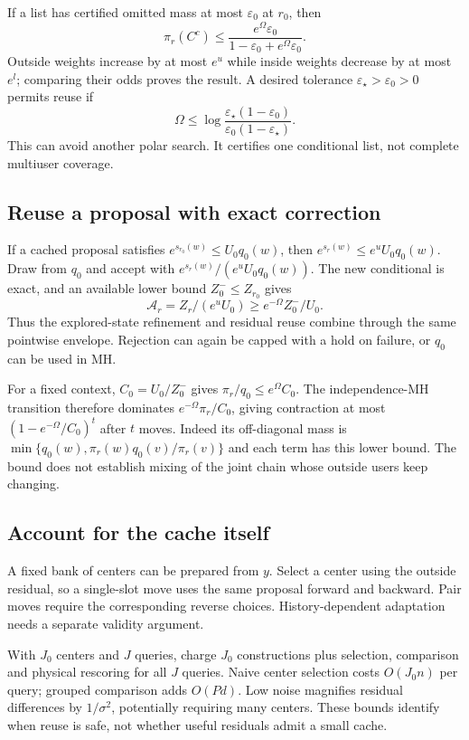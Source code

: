 \documentclass[10pt,a4paper]{article}
\begin{document}
If a list has certified omitted mass at most $\varepsilon_0$ at $r_0$, then
\begin{equation}
 \pi_r(C^c)\leq\frac{e^\Omega\varepsilon_0}{1-\varepsilon_0+e^\Omega\varepsilon_0}.
 \label{eq:reuse-odds}
\end{equation}
Outside weights increase by at most $e^u$ while inside weights decrease by at most $e^l$; comparing
their odds proves the result. A desired tolerance $\varepsilon_\star>\varepsilon_0>0$ permits reuse if
\[
 \Omega\leq\log\frac{\varepsilon_\star(1-\varepsilon_0)}{\varepsilon_0(1-\varepsilon_\star)}.
\]
This can avoid another polar search. It certifies one conditional list, not complete multiuser coverage.

\subsection{Reuse a proposal with exact correction}
If a cached proposal satisfies $e^{s_{r_0}(w)}\leq U_0q_0(w)$, then
$e^{s_r(w)}\leq e^uU_0q_0(w)$. Draw from $q_0$ and accept with
$e^{s_r(w)}/(e^uU_0q_0(w))$. The new conditional is exact, and an available lower bound
$Z_0^-\leq Z_{r_0}$ gives
\begin{equation}
 \mathcal A_r=Z_r/(e^uU_0)\geq e^{-\Omega}Z_0^-/U_0.
 \label{eq:reuse-acceptance}
\end{equation}
Thus the explored-state refinement and residual reuse combine through the same pointwise envelope.
Rejection can again be capped with a hold on failure, or $q_0$ can be used in MH.

For a fixed context, $C_0=U_0/Z_0^-$ gives $\pi_r/q_0\leq e^\Omega C_0$. The independence-MH transition
therefore dominates $e^{-\Omega}\pi_r/C_0$, giving contraction at most
$(1-e^{-\Omega}/C_0)^t$ after $t$ moves. Indeed its off-diagonal mass is
$\min\{q_0(w),\pi_r(w)q_0(v)/\pi_r(v)\}$ and each term has this lower bound.
The bound does not establish mixing of the joint chain whose outside users keep changing.

\subsection{Account for the cache itself}
A fixed bank of centers can be prepared from $y$. Select a center using the outside residual, so a
single-slot move uses the same proposal forward and backward. Pair moves require the corresponding
reverse choices. History-dependent adaptation needs a separate validity argument.

With $J_0$ centers and $J$ queries, charge $J_0$ constructions plus selection, comparison and physical
rescoring for all $J$ queries. Naive center selection costs $O(J_0n)$ per query; grouped comparison
adds $O(Pd)$. Low noise magnifies residual differences by $1/\sigma^2$, potentially requiring many centers.
These bounds identify when reuse is safe, not whether useful residuals admit a small cache.
\end{document}
